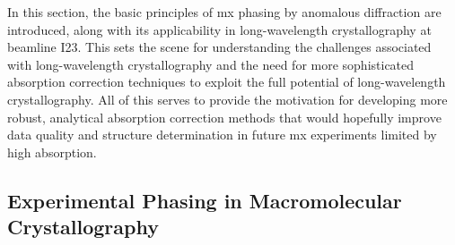 In this section, the basic principles of \ac{mx} phasing by anomalous diffraction are introduced, along with its applicability in long-wavelength crystallography at beamline I23. This sets the scene for understanding the challenges associated with long-wavelength crystallography and the need for more sophisticated absorption correction techniques to exploit the full potential of long-wavelength crystallography. %
All of this serves to provide the motivation for developing more robust, analytical absorption correction methods that would hopefully improve data quality and structure determination in future \ac{mx} experiments limited by high absorption.



\subsection{Experimental Phasing in Macromolecular Crystallography}

